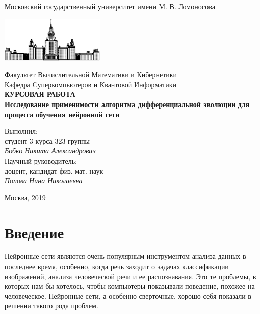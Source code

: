 \documentclass[12pt]{article}
\begin{document}
\begin{titlepage}
\begin{center}
    Московский государственный университет имени М. В. Ломоносова

    \bigskip
    \includegraphics[width=50mm]{msu.eps}

    \bigskip
    Факультет Вычислительной Математики и Кибернетики\\
    Кафедра Cуперкомпьютеров и Квантовой Информатики\\[10mm]

    \textsf{\large\bfseries
        КУРСОВАЯ РАБОТА\\[10mm]
        Исследование применимости алгоритма дифференциальной эволюции для процесса обучения нейронной сети
    }\\[10mm]

    \begin{flushright}
        \parbox{0.5\textwidth}{
            Выполнил:\\
            студент 3 курса 323 группы\\
            \emph{Бобко Никита Александрович}\\[5mm]
            Научный руководитель:\\
            доцент, кандидат физ.-мат. наук\\
            \emph{Попова Нина Николаевна}
        }
    \end{flushright}

    \vspace{\fill}
    Москва, 2019
\end{center}
\end{titlepage}

\newpage
\tableofcontents
\newpage

\section{Введение}
    Нейронные сети являются очень популярным инструментом анализа данных в последнее время, особенно, когда речь заходит о задачах классификации изображений, анализа человеческой речи и ее распознавания. Это те проблемы, в которых нам бы хотелось, чтобы компьютеры показывали поведение, похожее на человеческое. Нейронные сети, а особенно сверточные, хорошо себя показали в решении такого рода проблем. \\
\end{document}
